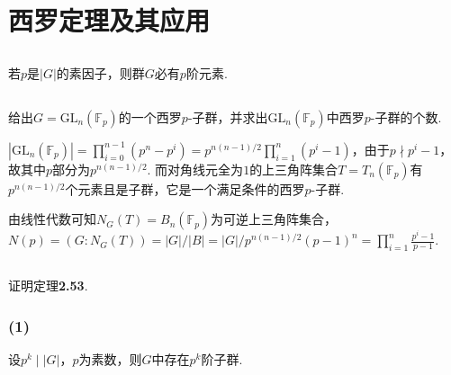 \section{西罗定理及其应用}
\subsection{}
若$p$是$|G|$的素因子，则群$G$必有$p$阶元素.


\subsection{}
给出$G=\mathrm{GL}_n(\mathbb{F}_p)$的一个西罗$p$-子群，并求出$\mathrm{GL}_n(\mathbb{F}_p)$中西罗$p$-子群的个数.

\jie $|\mathrm{GL}_n(\mathbb{F}_p)|=\prod_{i=0}^{n-1}(p^n-p^i)=p^{n(n-1)/2}\prod_{i=1}^{n}(p^i-1)$，由于$p\nmid p^i-1$，故其中$p$部分为$p^{n(n-1)/2}$. 而对角线元全为$1$的上三角阵集合$T=T_n(\mathbb{F}_p)$有$p^{n(n-1)/2}$个元素且是子群，它是一个满足条件的西罗$p$-子群.

由线性代数可知$N_G(T)=B_n(\mathbb{F}_p)$为可逆上三角阵集合，$N(p)=(G:N_G(T))=|G|/|B|
=|G|/p^{n(n-1)/2}(p-1)^n=\prod_{i=1}^n\frac{p^i-1}{p-1}$.

\subsection{}
证明{\heiti 定理}\textbf{2.53}.

\subsubsection{(1)}
设$p^k\mid |G|$，$p$为素数，则$G$中存在$p^k$阶子群.


